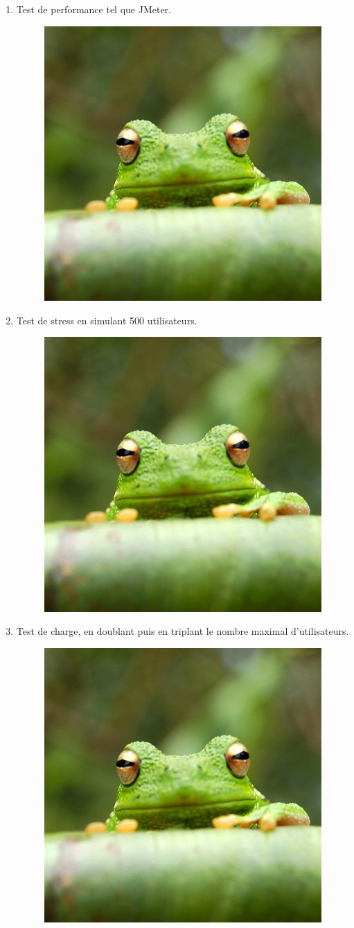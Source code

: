 \documentclass{article}
\begin{document}
\begin{enumerate}
    \item Test de performance tel que JMeter.
    \begin{figure}[H]
        \centering
        \includegraphics[width=0.5\linewidth]{assets/frog.jpg}
        \end{figure}
    \item Test de stress en simulant 500 utilisateurs.
    \begin{figure}[H]
        \centering
        \includegraphics[width=0.5\linewidth]{assets/frog.jpg}
        \end{figure}
    \item Test de charge, en doublant puis en triplant le nombre maximal d’utilisateurs.
    \begin{figure}[H]
        \centering
        \includegraphics[width=0.5\linewidth]{assets/frog.jpg}
        \end{figure}
\end{enumerate}
\end{document}
